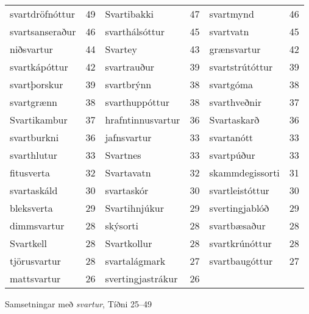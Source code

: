 \documentclass[../samsetningasafn.tex]{subfiles}
\begin{document}
\begin{wordlist}[ht!]
\begin{tcolorbox}

	\setlength{\extrarowheight}{3pt}
	\begin{tabular}{BlBlBl}	
		svartdröfnóttur 	& 49	& 
		Svartibakki		& 47	& 
		svartmynd		& 46	\\ 	
		svartsanseraður	& 46	& 
		svarthálsóttur	& 45	& 
		svartvatn		& 45	\\ 
		niðsvartur		& 44	& 
		Svartey		& 43	& 
		grænsvartur		& 42	\\ 
		svartkápóttur	& 42	& 
		svartrauður		& 39	& 
		svartstrútóttur	& 39	\\ 
		svartþorskur		& 39	& 
		svartbrýnn		& 38	& 
		svartgóma		& 38	\\ 
		svartgrænn		& 38	& 
		svarthuppóttur	& 38	& 
		svarthveðnir		& 37	\\ 
		Svartikambur		& 37	& 
		hrafntinnusvartur	& 36	& 
		Svartaskarð		& 36	\\ 
		svartburkni		& 36	& 
		jafnsvartur		& 33	& 
		svartanótt		& 33	\\ 
		svarthlutur		& 33	& 
		Svartnes		& 33	& 
		svartpúður		& 33	\\ 
		fitusverta		& 32	& 
		Svartavatn		& 32	& 
		skammdegissorti	& 31	\\ 
		svartaskáld		& 30	& 
		svartaskór		& 30	& 
		svartleistóttur	& 30	\\ 
		bleksverta		& 29	& 
		Svartihnjúkur	& 29	& 
		svertingjablóð	& 29	\\ 
		dimmsvartur		& 28	& 
		skýsorti		& 28	& 
		svartbæsaður	& 28	\\ 
		Svartkell		& 28	& 
		Svartkollur		& 28	& 
		svartkrúnóttur	& 28	\\ 
		tjörusvartur		& 28	& 
		svartalágmark	& 27	& 
		svartbaugóttur	& 27	\\ 
		mattsvartur		& 26	& 
		svertingjastrákur	& 26	& 
					&
	\end{tabular}

\end{tcolorbox}
	\caption{Samsetningar með \textit{svartur}, Tíðni 25--49}
	\label{listi:svart.50}
\end{wordlist}
\end{document}
